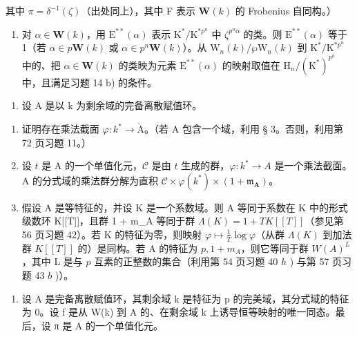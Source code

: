 \(\text{其中 }\pi = \delta^{-1}(\zeta)\)（出处同上），其中 F 表示 \(\mathbf{W}(k)\) 的 Frobenius 自同构。）

\begin{enumerate}
\def\labelenumi{\alph{enumi})}
\setcounter{enumi}{1}
\tightlist
\item
  对 \(\alpha \in \mathbf{W}(k)\)，用 \(\mathrm{E}^{**}(\alpha)\) 表示 \(\mathrm{K}^* / \mathrm{K}^{*p^n}\) 中 \(\zeta^{p^n\overline{\alpha}}\) 的类。则 \(\mathrm{E}^{**}(\alpha)\) 等于 1（若 \(\alpha \in p\mathbf{W}(k)\) 或 \(\alpha \in p^n\mathbf{W}(k)\)）。从 \(\mathrm{W}_n(k)/\wp\mathrm{W}_n(k)\) 到 \(\mathrm{K}^* / \mathrm{K}^{*p^n}\) 中的、把 \(\alpha \in \mathbf{W}(k)\) 的类映为元素 \(\mathrm{E}^{**}(\alpha)\) 的映射取值在 \(\mathrm{H}_n / (\mathrm{K}^*)^{p^n}\) 中，且满足习题 14 b) 的条件。
\end{enumerate}

\begin{enumerate}
\def\labelenumi{\arabic{enumi})}
\setcounter{enumi}{15}
\tightlist
\item
  设 A 是以 k 为剩余域的完备离散赋值环。
\end{enumerate}

\begin{enumerate}
\def\labelenumi{\alph{enumi})}
\item
  证明存在乘法截面 \(\varphi:k^{*}\to\mathring{\mathrm{A}}\)。（若 A 包含一个域，利用 § 3。否则，利用第 72 页习题 11。）
\item
  设 \(t\) 是 A 的一个单值化元，\(\mathcal{C}\) 是由 \(t\) 生成的群，\(\varphi:k^{*}\to A\) 是一个乘法截面。A 的分式域的乘法群分解为直积 \(\mathcal{C}\times\varphi(k^{*})\times(1+\mathfrak{m}_{\mathbf{A}})\)。
\item
  假设 A 是等特征的，并设 K 是一个系数域。则 A 等同于系数在 K 中的形式级数环 K{[}{[}T{]}{]}，且群 1 + m\_A 等同于群 \(\Lambda(K) = 1 + TK[[T]]\)（参见第 56 页习题 42）。若 K 的特征为零，则映射 \(\varphi \mapsto \frac{1}{T} \log \varphi\)（从群 \(\Lambda(K)\) 到加法群 \(K[[T]]\) 的）是同构。若 A 的特征为 \(p, 1 + m_A\)，则它等同于群 \(W(A)^L\)，其中 L 是与 \(p\) 互素的正整数的集合（利用第 54 页习题 40 \(h\) ) 与第 57 页习题 43 \(b\) )）。
\end{enumerate}

\begin{enumerate}
\def\labelenumi{\arabic{enumi})}
\setcounter{enumi}{16}
\tightlist
\item
  设 A 是完备离散赋值环，其剩余域 k 是特征为 p 的完美域，其分式域的特征为 0。设 f 是从 W(k) 到 A 的、在剩余域 k 上诱导恒等映射的唯一同态。最后，设 π 是 A 的一个单值化元。
\end{enumerate}

